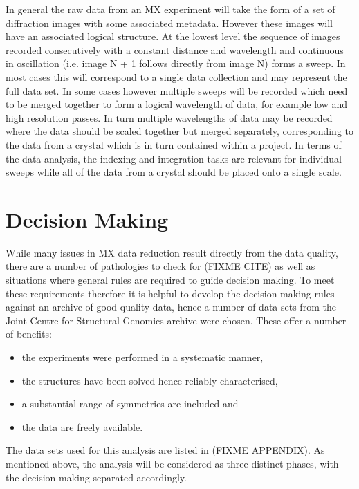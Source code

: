 \documentclass[a4paper, 11pt]{article}
\begin{document}
In general the raw data from an MX experiment will take the form of a set of diffraction images with some associated metadata. However these images will have an associated logical structure. At the lowest level the sequence of images recorded consecutively with a constant distance and wavelength and continuous in oscillation (i.e. image N + 1 follows directly from image N) forms a sweep. In most cases this will correspond to a single data collection and may represent the full data set. In some cases however multiple sweeps will be recorded which need to be merged together to form a logical wavelength of data, for example low and high resolution passes. In turn multiple wavelengths of data may be recorded where the data should be scaled together but merged separately, corresponding to the data from a crystal which is in turn contained within a project. In terms of the data analysis, the indexing and integration tasks are relevant for individual sweeps while all of the data from a crystal should be placed onto a single scale. 

\section{Decision Making}

While many issues in MX data reduction result directly from the data quality, there are a number of pathologies to check for (FIXME CITE) as well as situations where general rules are required to guide decision making. To meet these requirements therefore it is helpful to develop the decision making rules against an archive of good quality data, hence a number of data sets from the Joint Centre for Structural Genomics archive were chosen. These offer a number of benefits:

\begin{itemize}
\item{the experiments were performed in a systematic manner,}
\item{the structures have been solved hence reliably characterised,}
\item{a substantial range of symmetries are included and}
\item{the data are freely available.}
\end{itemize}

\noindent
The data sets used for this analysis are listed in (FIXME APPENDIX). As mentioned above, the analysis will be considered as three distinct phases, with the decision making separated accordingly.
\end{document}
